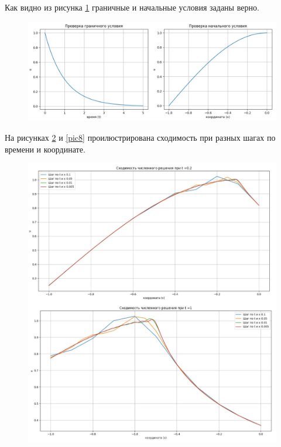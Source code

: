 \documentclass[a4paper,14pt]{article}
\begin{document}
Как видно из рисунка \ref{pic6} граничные и начальные условия заданы верно.

\begin{figure}[h!]
\centering
\includegraphics[scale=0.35]{ГУНУ.jpg}
\caption{\label{pic6}}
\end{figure}

На рисунках \ref{pic7} и \ref{pic8} проилюстрирована сходимость при разных шагах по времени и координате.

\begin{figure}[h!]
\centering
\includegraphics[scale=0.3]{сходимость1.jpg}
\caption{\label{pic7}}
\end{figure}
\end{document}
